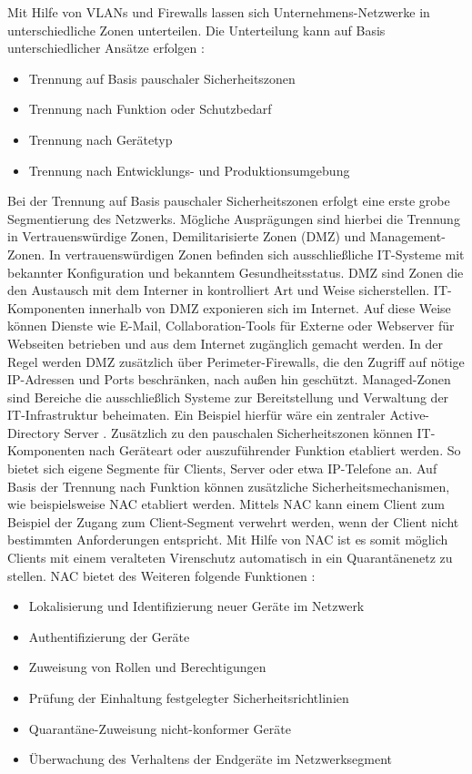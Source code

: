 \bigbreak
Mit Hilfe von VLANs und Firewalls lassen sich Unternehmens-Netzwerke in unterschiedliche Zonen unterteilen. Die Unterteilung kann auf Basis unterschiedlicher Ansätze erfolgen \autocite{the_bristol_group_deutschland_gmbh_2021}:
\begin{itemize}
    \item Trennung auf Basis pauschaler Sicherheitszonen
    \item Trennung nach Funktion oder Schutzbedarf
    \item Trennung nach Gerätetyp 
    \item Trennung nach Entwicklungs- und Produktionsumgebung
\end{itemize}
\bigbreak
Bei der Trennung auf Basis pauschaler Sicherheitszonen erfolgt eine erste grobe Segmentierung des Netzwerks. Mögliche Ausprägungen sind hierbei die Trennung in \glqq{}Vertrauenswürdige Zonen\grqq{}, \glqq{}Demilitarisierte Zonen (DMZ)\grqq{} und \glqq{}Management-Zonen\grqq{}. In vertrauenswürdigen Zonen befinden sich ausschließliche IT-Systeme mit bekannter Konfiguration und bekanntem Gesundheitsstatus. DMZ sind Zonen die den Austausch mit dem Interner in kontrolliert Art und Weise sicherstellen. IT-Komponenten innerhalb von DMZ exponieren sich im Internet. Auf diese Weise können Dienste wie E-Mail, Collaboration-Tools für Externe oder Webserver für Webseiten betrieben und aus dem Internet zugänglich gemacht werden. In der Regel werden DMZ zusätzlich über Perimeter-Firewalls, die den Zugriff auf nötige IP-Adressen und Ports beschränken, nach außen hin geschützt. Managed-Zonen sind Bereiche die ausschließlich Systeme zur Bereitstellung und Verwaltung der IT-Infrastruktur beheimaten. Ein Beispiel hierfür wäre ein zentraler Active-Directory Server \autocite{iainfoulds}. 
\bigbreak
Zusätzlich zu den pauschalen Sicherheitszonen können IT-Komponenten nach Geräteart oder auszuführender Funktion etabliert werden. So bietet sich eigene Segmente für Clients, Server oder etwa IP-Telefone an. Auf Basis der Trennung nach Funktion können zusätzliche Sicherheitsmechanismen, wie beispielsweise NAC etabliert werden. Mittels NAC kann einem Client zum Beispiel der Zugang zum Client-Segment verwehrt werden, wenn der Client nicht bestimmten Anforderungen entspricht. Mit Hilfe von NAC ist es somit möglich Clients mit einem veralteten Virenschutz automatisch in ein Quarantänenetz zu stellen. 
\bigbreak
NAC bietet des Weiteren folgende Funktionen \autocite{sandata_2022}:
\begin{itemize}
    \item Lokalisierung und Identifizierung neuer Geräte im Netzwerk
    \item Authentifizierung der Geräte 
    \item Zuweisung von Rollen und Berechtigungen
    \item Prüfung der Einhaltung festgelegter Sicherheitsrichtlinien
    \item Quarantäne-Zuweisung nicht-konformer Geräte
    \item Überwachung des Verhaltens der Endgeräte im Netzwerksegment
\end{itemize}
